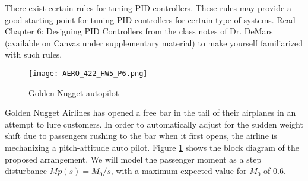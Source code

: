 \documentclass[10.5pt,letter]{exam}
\newcommand{\ans}[1]{\textcolor{blue}{#1}}
\begin{document}
\begin{questions}
\question[4] There exist certain rules for tuning PID controllers. These rules may provide a good starting point for tuning PID controllers for certain type of systems. Read Chapter 6: Designing PID Controllers from the class notes of Dr. DeMars (available on Canvas under supplementary material) to make yourself familiarized with such rules. 

\begin{figure}[hbt!]
    \centering
    \texttt{[image: AERO\_422\_HW5\_P6.png]}
    \caption{Golden Nugget autopilot}
    \label{fig:GoldenNugget}
\end{figure}

\question[Bonus] Golden Nugget Airlines has opened a free bar in the tail of their airplanes
in an attempt to lure customers. In order to automatically adjust for the
sudden weight shift due to passengers rushing to the bar when it first
opens, the airline is mechanizing a pitch-attitude auto pilot. Figure \ref{fig:GoldenNugget}
shows the block diagram of the proposed arrangement. We will model the
passenger moment as a step disturbance $Mp(s) = M_0/s$, with a maximum
expected value for $M_0$ of 0.6.
\end{questions}
\end{document}
